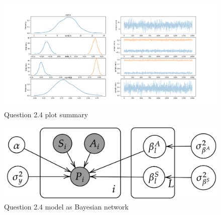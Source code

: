 \documentclass[11pt,a4paper,titlepage]{article}
\begin{document}
\begin{appendices}
    \begin{figure}[htb]
      \centering
        \includegraphics[width=\textwidth]{../q24/q24_plot_summary.png}
        \caption{Question 2.4 plot summary}
      \label{fig:2.4}
    \end{figure}

    \begin{figure}[htb]
      \centering
        \includegraphics[width=\textwidth]{../q24/q24_bnet.png}
        \caption{Question 2.4 model as Bayesian network}
      \label{fig:2.4_bnet}
    \end{figure}
\end{appendices}

\printbibliography
\end{document}

